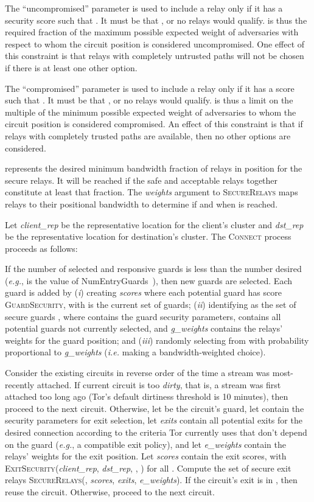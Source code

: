 \documentclass[conference]{styles/IEEEtran}
\newcommand{\eg}{\emph{e.g.}}
\newcommand{\ie}{\emph{i.e.}}
\begin{document}
The ``uncompromised'' parameter
 is used to include a relay only if it has a
security score  such that . It must be that , or no
relays would qualify.  is thus the required fraction of the maximum possible expected
weight of adversaries with
respect to whom the circuit position is considered uncompromised. One effect of this constraint is
that relays with completely untrusted paths will not be chosen if there is at least one other
option.

The ``compromised'' parameter  is used to
include a relay only if it has a score  such that .
It must be that , or no relays would qualify.
 is thus a limit on the multiple of the minimum possible expected weight of adversaries to
whom the circuit position is considered compromised. An effect of this constraint is that if
relays with completely trusted paths are available, then no other options are considered.

 represents the desired minimum bandwidth fraction of relays in position  for
the secure relays. It will be reached if the safe and acceptable relays together constitute at least
that fraction. The \textit{weights} argument to \textsc{SecureRelays} maps relays to their
positional bandwidth to determine if and when  is reached.

Let \textit{client\_rep} be the representative location for the client's cluster and
\textit{dst\_rep} be the representative location for destination's cluster. The \textsc{Connect}
process proceeds as follows:

If the number  of selected and responsive guards is less than the number  desired
(\eg{},  is the value of \textsf{NumEntryGuards}~\cite{dir-spec}), then  new guards are
selected. Each guard is added by (\emph{i}) creating \textit{scores} where each potential guard 
has score
\textsc{GuardSecurity}, with  is the current set of guards;
(\emph{ii}) identifying as the set of secure guards
, where 
contains the guard security parameters,  contains all potential guards not currently selected,
and \textit{g\_weights} contains the relays' weights for the guard position; and (\emph{iii})
randomly selecting from  with probability proportional to \textit{g\_weights} (\ie{} making a
bandwidth-weighted choice).


Consider the existing circuits in reverse order of the time a stream was most-recently
attached. If current circuit  is too \textit{dirty}, that is, a stream was first attached too
long ago (Tor's default dirtiness threshold is 10 minutes), then proceed to the next circuit.
Otherwise, let
 be the circuit's guard, let  contain the security parameters for exit
selection, let \textit{exits} contain all potential exits for the desired connection according to
the criteria Tor currently uses that don't depend on the guard (\eg{}, a compatible exit policy),
and let \textit{e\_weights} contain the relays' weights for the exit position. Let
\textit{scores} contain
the exit scores, with  \textsc{ExitSecurity}(\textit{client\_rep},
\textit{dst\_rep}, , ) for all . Compute the set of secure exit relays
 \textsc{SecureRelays}(, \textit{scores}, \textit{exits}, \textit{e\_weights}).
If the circuit's exit  is in , then reuse the circuit. Otherwise, proceed to the next
circuit.
\end{document}
